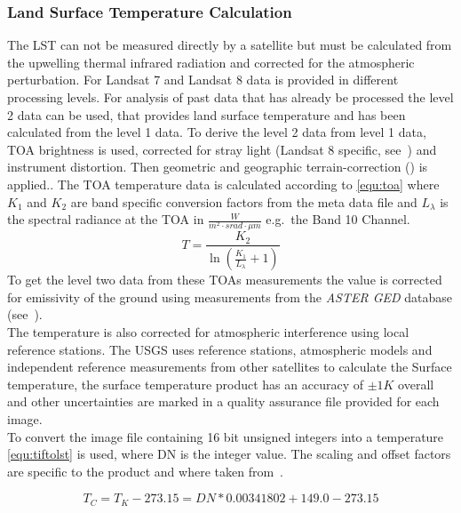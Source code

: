 \documentclass[12pt,a4paper, english,twoside]{article}
\begin{document}
    \subsubsection{Land Surface Temperature Calculation}\label{sec:lstcalc}
      The \gls{LST} can not be measured directly by a satellite but must be calculated from the upwelling thermal infrared radiation and corrected for the atmospheric perturbation. 
      For Landsat 7 and Landsat 8 data is provided in different processing levels.
      For analysis of past data that has already be processed the level 2 data can be used, that provides land surface temperature and has been calculated from the level 1 data. 
      To derive the level 2 data from level 1 data, \gls{TOA} brightness is used, corrected for stray light (Landsat 8 specific, see~\autocite[p.~67]{Zanter2019}) and instrument distortion. Then geometric and geographic terrain-correction (\cite[p.~44]{Zanter2019}) is applied..
      The \gls{TOA} temperature data is calculated according to \cref{equ:toa} where $K_1$ and $K_2$ are band specific conversion factors from the meta data file and $L_\lambda$ is the spectral radiance at the TOA in $\frac{W}{m^2\cdot srad \cdot \mu m}$ e.g.\ the Band 10 Channel. 
      \begin{equation}\label{equ:toa}
  	    T = \frac{K_2}{\ln\left(\frac{K_1}{L_{\lambda}}+1\right)}
      \end{equation}
      To get the level two data from these \glspl{TOA} measurements the value is corrected for emissivity of the ground using measurements from the \textit{ASTER GED} database (see~\autocite{USGSWebsite}).\\
      The temperature is also corrected for atmospheric interference using local reference stations. 
      The USGS uses reference stations, atmospheric models and independent reference measurements from other satellites to calculate the Surface temperature, the surface temperature product has an accuracy of $\pm 1 K$ overall and other uncertainties are marked in a quality assurance file provided for each image.\\
      To convert the image file containing 16 bit unsigned integers into a temperature \cref{equ:tiftolst} is used, where DN is the integer value. The scaling and offset factors are specific to the product and where taken from~\autocite{EROASC2013}.
  
      \begin{equation}\label{equ:tiftolst}
        T_C = T_K - 273.15 = DN*0.00341802 + 149.0 - 273.15 
      \end{equation}
\end{document}
